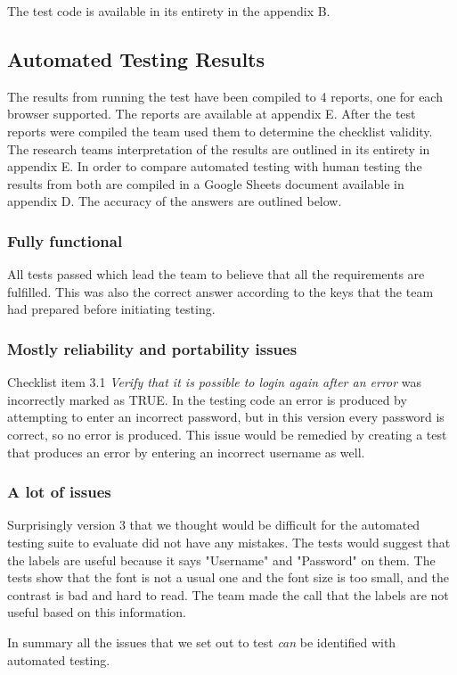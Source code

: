 \documentclass[journal,twocolumn]{IEEEtran}
\begin{document}
The test code is available in its entirety in the appendix B.

\subsection{Automated Testing Results}
The results from running the test have been compiled to 4 reports, one for each browser supported. The reports are available at appendix E.
After the test reports were compiled the team used them to determine the checklist validity. The research teams interpretation of the results are outlined in its entirety in appendix E.
In order to compare automated testing with human testing the results from both are compiled in a Google Sheets document available in appendix D.
The accuracy of the answers are outlined below.
\subsubsection{Fully functional}
All tests passed which lead the team to believe that all the requirements are fulfilled. This was also the correct answer according to the keys that the team had prepared before initiating testing.

\subsubsection{Mostly reliability and portability issues}
Checklist item 3.1 \textit{Verify that it is possible to login again after an error} was incorrectly marked as TRUE. In the testing code an error is produced by attempting to enter an incorrect password, but in this version every password is correct, so no error is produced. This issue would be remedied by creating a test that produces an error by entering an incorrect username as well.

\subsubsection{A lot of issues}
Surprisingly version 3 that we thought would be difficult for the automated testing suite to evaluate did not have any mistakes. The tests would suggest that the labels are useful because it says "Username" and "Password" on them. The tests show that the font is not a usual one and the font size is too small, and the contrast is bad and hard to read. The team made the call that the labels are not useful based on this information.

In summary all the issues that we set out to test \textit{can} be identified with automated testing.
\end{document}
